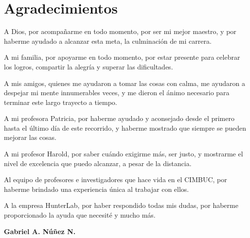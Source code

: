 \chapter*{Agradecimientos}

	A Dios, por acompa\~{n}arme en todo momento, por ser mi mejor maestro, y por haberme ayudado a alcanzar esta meta, la culminaci\'{o}n de mi carrera.

	A mi familia, por apoyarme en todo momento, por estar presente para celebrar los logros, compartir la alegr\'{i}a y superar las dificultades.

	A mis amigos, quienes me ayudaron a tomar las cosas con calma, me ayudaron a despejar mi mente innumerables veces, y me dieron el \'{a}nimo necesario para terminar este largo trayecto a tiempo.

	A mi profesora Patricia, por haberme ayudado y aconsejado desde el primero hasta el \'{u}ltimo d\'{i}a de este recorrido, y haberme mostrado que siempre se pueden mejorar las cosas.

	A mi profesor Harold, por saber cu\'{a}ndo exigirme m\'{a}s, ser justo, y mostrarme el nivel de excelencia que puedo alcanzar, a pesar de la distancia.

	Al equipo de profesores e investigadores que hace vida en el CIMBUC, por haberme brindado una experiencia \'{u}nica al trabajar con ellos.

	A la empresa HunterLab, por haber respondido todas mis dudas, por haberme proporcionado la ayuda que necesit\'{e} y mucho m\'{a}s.


\begin{flushright}
	\textbf{Gabriel A. N\'{u}\~{n}ez N.}
\end{flushright}
